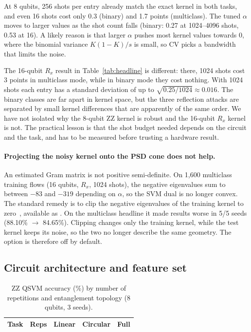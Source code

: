 At 8 qubits, 256 shots per entry already match the exact kernel in both tasks, and even 16
shots cost only 0.3 (binary) and 1.7 points (multiclass). The tuned $\alpha$ moves to larger
values as the shot count falls (binary: 0.27 at 1024--4096 shots, 0.53 at 16). A likely reason
is that larger $\alpha$ pushes most kernel values towards 0, where the binomial variance
$K(1-K)/s$ is small, so CV picks a bandwidth that limits the noise.

The 16-qubit $R_x$ result in Table~\ref{tab:headline} is different: there, 1024 shots cost 3
points in multiclass mode, while in binary mode they cost nothing. With 1024 shots each entry has
a standard deviation of up to $\sqrt{0.25/1024}\approx0.016$. The binary classes are far apart
in kernel space, but the three reflection attacks are separated by small kernel differences that
are apparently of the same order. We have not isolated why the 8-qubit ZZ kernel is robust and
the 16-qubit $R_x$ kernel is not. The practical lesson is that the shot budget needed depends on
the circuit and the task, and has to be measured before trusting a hardware result.

\paragraph{Projecting the noisy kernel onto the PSD cone does not help.} An estimated Gram matrix
is not positive semi-definite. On 1{,}600 multiclass training flows (16 qubits, $R_x$, 1024
shots), the negative eigenvalues sum to between $-83$ and $-319$ depending on $\alpha$, so the
SVM dual is no longer convex. The standard remedy is to clip the negative eigenvalues of the
training kernel to zero~\cite{hubregtsen2022}, available as . On the multiclass
headline it made results worse in 5/5 seeds (88.10\% $\to$ 84.65\%). Clipping changes only the
training kernel, while the test kernel keeps its noise, so the two no longer describe the same
geometry. The option is therefore off by default.

\subsection{Circuit architecture and feature set}

\begin{table}[H]
\centering\small
\caption{ZZ QSVM accuracy (\%) by number of repetitions and entanglement topology (8 qubits,
3 seeds).}
\label{tab:arch}
\begin{tabular}{llccc}
\toprule
Task & Reps & Linear & Circular & Full \\
\midrule

\bottomrule
\end{tabular}
\end{table}

